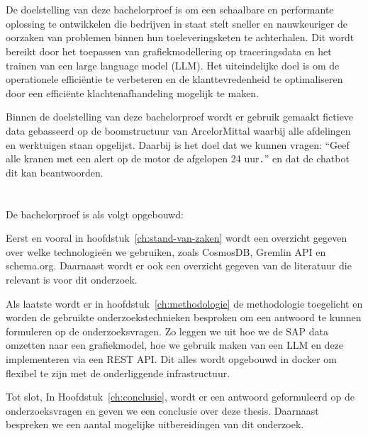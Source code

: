 \section{}%
\label{sec:onderzoeksdoelstelling}

De doelstelling van deze bachelorproef is om een schaalbare en performante oplossing te ontwikkelen die bedrijven in staat stelt sneller en nauwkeuriger de oorzaken van problemen binnen hun toeleveringsketen te achterhalen. 
Dit wordt bereikt door het toepassen van grafiekmodellering op traceringsdata en het trainen van een large language model (LLM). 
Het uiteindelijke doel is om de operationele efficiëntie te verbeteren en de klanttevredenheid te optimaliseren door een efficiënte klachtenafhandeling mogelijk te maken.

Binnen de doelstelling van deze bachelorproef wordt er gebruik gemaakt fictieve data gebasseerd op de boomstructuur van ArcelorMittal waarbij alle afdelingen en werktuigen staan opgelijst. 
Daarbij is het doel dat we kunnen vragen: ``Geef alle kranen met een alert op de motor de afgelopen 24 uur\texttt{.}'' en dat de chatbot dit kan beantwoorden.
\section{}%
\label{sec:opzet-bachelorproef}

De bachelorproef is als volgt opgebouwd:

Eerst en vooral in hoofdstuk~\ref{ch:stand-van-zaken} wordt een overzicht gegeven over welke technologieën we gebruiken, zoals CosmosDB, Gremlin API en schema.org.
Daarnaast wordt er ook een overzicht gegeven van de literatuur die relevant is voor dit onderzoek.

Als laatste wordt er in hoofdstuk~\ref{ch:methodologie} de methodologie toegelicht en worden de gebruikte onderzoekstechnieken besproken om een antwoord te kunnen formuleren op de onderzoeksvragen.
Zo leggen we uit hoe we de SAP data omzetten naar een grafiekmodel, hoe we gebruik maken van een LLM en deze implementeren via een REST API.\@
Dit alles wordt opgebouwd in docker om flexibel te zijn met de onderliggende infrastructuur.


Tot slot, In Hoofdstuk~\ref{ch:conclusie}, wordt er een antwoord geformuleerd op de onderzoeksvragen en geven we een conclusie over deze thesis. Daarnaast bespreken we een aantal mogelijke uitbereidingen van dit onderzoek.
